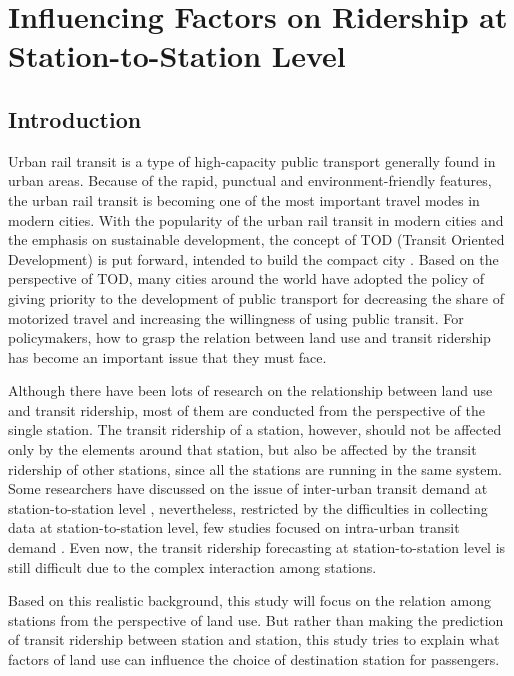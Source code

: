\chapter{Influencing Factors on Ridership at Station-to-Station Level}

\section{Introduction}
Urban rail transit is a type of high-capacity public transport generally found in urban areas. Because of the rapid, punctual and environment-friendly features, the urban rail transit is becoming one of the most important travel modes in modern cities. With the popularity of the urban rail transit in modern cities and the emphasis on sustainable development, the concept of TOD (Transit Oriented Development) is put forward, intended to build the compact city \cite{calthorpe1993next}. Based on the perspective of TOD, many cities around the world have adopted the policy of giving priority to the development of public transport for decreasing the share of motorized travel and increasing the willingness of using public transit. For policymakers, how to grasp the relation between land use and transit ridership has become an important issue that they must face.

Although there have been lots of research on the relationship between land use and transit ridership, most of them are conducted from the perspective of the single station. The transit ridership of a station, however, should not be affected only by the elements around that station, but also be affected by the transit ridership of other stations, since all the stations are running in the same system. Some researchers have discussed on the issue of inter-urban transit demand at station-to-station level \cite{wardman1997inter,jones1983demand}, nevertheless, restricted by the difficulties in collecting data at station-to-station level, few studies focused on intra-urban transit demand \cite{choi2012analysis}. Even now, the transit ridership forecasting at station-to-station level is still difficult due to the complex interaction among stations. 

Based on this realistic background, this study will focus on the relation among stations from the perspective of land use. But rather than making the prediction of transit ridership between station and station, this study tries to explain what factors of land use can influence the choice of destination station for passengers. 

